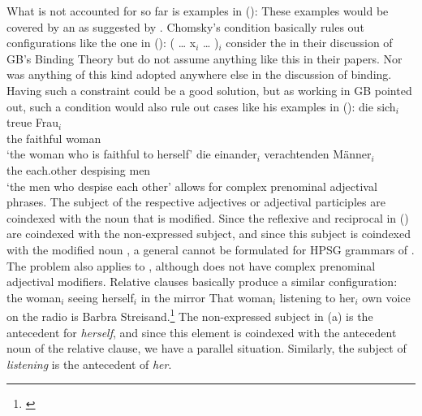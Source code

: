 \documentclass[output=paper,biblatex,babelshorthands,newtxmath,draftmode,colorlinks,citecolor=brown]{langscibook}
\begin{document}
What is not accounted for so far is  examples in ():
\eal
\label{ex-i-within-i-Fanselow}
\zl
These examples would be covered by an \iwithinic{} as suggested by
\citet[]{Chomsky81a}. Chomsky's condition basically rules out configurations like the one
in ():
\ea
( \ldots{} x$_i$ \ldots{} )$_i$
\z
\citet[]{ps2} consider the \iwithinic in their discussion of GB's Binding Theory but do not
assume anything like this in their papers. Nor was anything of this kind adopted anywhere else in
the discussion of binding. Having such a constraint could be a good solution, but as
\citet[]{Fanselow86a} working in GB pointed out, such a condition would also rule out cases like his examples in ():
\eal
\ex
\gll die sich$_i$ treue Frau$_i$\\
     the \self{} faithful woman\\
\glt `the woman who is faithful to herself'
\ex 
\gll die einander$_i$ verachtenden Männer$_i$\\
     the each.other   despising    men\\
\glt `the men who despise each other'
\zl
{} allows for complex prenominal adjectival phrases. The subject of the respective adjectives or
adjectival participles are coindexed with the noun that is modified. Since the reflexive and
reciprocal in () are coindexed with the non-expressed subject, and since this subject is
coindexed with the modified noun \citep[Section~3.2.7]{Mueller2002b}, a general \iwithinic cannot be formulated for HPSG
grammars of . The problem also applies to , although  does not have complex
prenominal adjectival modifiers. Relative clauses basically produce a similar configuration:
\ealnoraggedright
\ex the woman$_i$ seeing herself$_i$ in the mirror
\ex {}That woman$_i$ listening to her$_i$ own voice on the radio is Barbra Strei\-sand.\footnote{
\citet[]{Varaschin2021a-u}
}
\zl
The non-expressed subject in (a) is the antecedent for \emph{herself}, and since this element
is coindexed with the antecedent noun of the relative clause, we have a parallel
situation. Similarly, the subject of \emph{listening} is the antecedent of \emph{her}.
\end{document}
